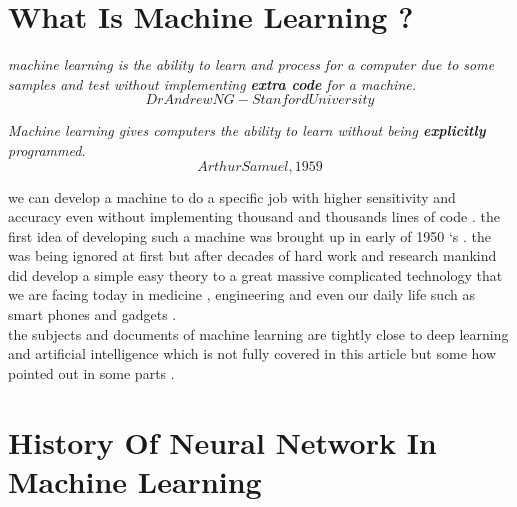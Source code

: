 \documentclass[12pt , a4paper]{article}
\begin{document}
%

\newpage



\section {What Is Machine Learning ?}
\begin{displayquote}
\textit{machine learning is the ability to learn and process for a computer due to some samples and test without implementing \textbf{extra code} for a machine.}
\[ Dr Andrew NG  -  Stanford University \]

\textit{Machine learning gives computers the ability to learn without being \textbf{explicitly }programmed.}
\[ Arthur Samuel, 1959 \]
\end{displayquote}
we can develop a machine to do a specific job with higher sensitivity and accuracy even without implementing thousand and thousands lines of code . the first idea of developing such a machine was brought up in early of 1950 ‘s . the was being ignored at first but after decades of hard work and research mankind did develop a simple easy theory to a great massive complicated technology that we are facing today in medicine , engineering and even our daily life such as smart phones and gadgets .\\
the subjects and documents of machine learning are tightly close to deep learning and artificial intelligence which is not fully covered in this article but some how pointed out in some parts .  \\

\section  { History Of Neural Network In Machine Learning }
 
\end{document}
